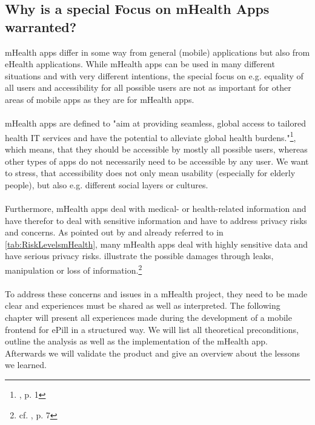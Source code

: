 \subsection{Why is a special Focus on mHealth Apps warranted?}
mHealth apps differ in some way from general (mobile) applications but also from eHealth applications. While mHealth apps can be used in many different situations and with very different intentions, the special focus on e.g. equality of all users and accessibility for all possible users are not as important for other areas of mobile apps as they are for mHealth apps. 
\\
\\
mHealth apps are defined to "aim at providing seamless, global access to tailored health IT services and have the potential to alleviate global health burdens."\footnote{\cite{Dehling.2013}, p. 1}, which means, that they should be accessible by mostly all possible users, whereas other types of apps do not necessarily need to be accessible by any user. We want to stress, that accessibility does not only mean usability (especially for elderly people), but also e.g. different social layers or cultures.
\\
\\
Furthermore, mHealth apps deal with medical- or health-related information and have therefor to deal with sensitive information and have to address privacy risks and concerns. As pointed out by \cite{Njie.2013} and already referred to in \ref{tab:RiskLevelsmHealth}, many mHealth apps deal with highly sensitive data and have serious privacy risks. \cite{Dehling.2013} illustrate the possible damages through leaks, manipulation or loss of information.\footnote{cf. \cite{Dehling.2013}, p. 7}
\\
\\
To address these concerns and issues in a mHealth project, they need to be made clear and experiences must be shared as well as interpreted. The following chapter will present all experiences made during the development of a mobile frontend for ePill in a structured way. We will list all theoretical preconditions, outline the analysis as well as the implementation of the mHealth app. Afterwards we will validate the product and give an overview about the lessons we learned.